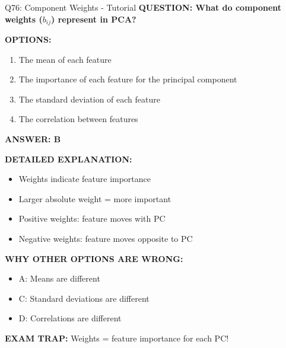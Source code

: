 \documentclass[8pt]{beamer}
\begin{document}
	\begin{frame}{Q76: Component Weights - Tutorial}
		\fontsize{6.5}{7.5}\selectfont
		\textbf{QUESTION: What do component weights ($b_{ij}$) represent in PCA?}
		
		\vspace{0.1cm}
		\textbf{OPTIONS:}
		\begin{enumerate}
			\item The mean of each feature
			\item The importance of each feature for the principal component
			\item The standard deviation of each feature
			\item The correlation between features
		\end{enumerate}
		
		\vspace{0.1cm}
		\textcolor{myblue}{\textbf{ANSWER: B}}
		
		\vspace{0.1cm}
		\textbf{DETAILED EXPLANATION:}
		\begin{itemize}
			\item Weights indicate feature importance
			\item Larger absolute weight = more important
			\item Positive weights: feature moves with PC
			\item Negative weights: feature moves opposite to PC
		\end{itemize}
		
		\vspace{0.1cm}
		\textcolor{myred}{\textbf{WHY OTHER OPTIONS ARE WRONG:}}
		\begin{itemize}
			\item \textcolor{myred}{A:} Means are different
			\item \textcolor{myred}{C:} Standard deviations are different
			\item \textcolor{myred}{D:} Correlations are different
		\end{itemize}
		
		\textcolor{myred}{\textbf{EXAM TRAP:}} Weights = \textcolor{myblue}{feature importance for each PC}!
	\end{frame}
	
\end{document}
